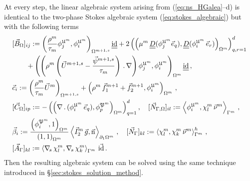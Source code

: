 At every step, the linear algebraic system arising from (\ref{eq:ns_HGalea}--d)
is identical to the two-phase Stokes algebraic system
(\ref{eq:stokes_algebraic}) but with the following terms
\begin{align*}
& [\vec B_\Omega]_{ij} := \left( \frac{\rho^m}{\tau_m}
\phi_j^{\uspacesimpleale^m},
\phi_i^{\uspacesimpleale^m} \right)_{\Omega^{m+1,s}}\mat \id
+ 2\left(\left(\mu^m\,\mat D(\phi_j^{\uspacesimpleale^m} \vec e_q),
\mat D(\phi_i^{\uspacesimpleale^m}\,\vec e_r)\right)_{\Omega^m}
\right)_{q,r=1}^d\\
& \qquad + \left( \left(\rho^m \left(\vec U^{m+1,s} -
\frac{\vec \psi^{m+1,s}}{\tau_m}\right)\,.\,\nabla \right)
\phi_j^{\uspacesimpleale^m},\phi_i^{\uspacesimpleale^m}
\right)_{\Omega^m}\mat \id \,,\\
& \vec c_i := \left( \frac{\rho^m}{\tau_m}\vec U^m \right)_{\Omega^{m+1,s}}
+ \left(\rho^m\,\vec f_1^{m+1}+\vec f_2^{m+1},
\phi_i^{\uspacesimpleale^m}\right)_{\Omega^m}\,,\\
& [\vec C_\Omega]_{ip} := - \left(
\left(\nabla\,.\,(\phi_i^{\uspacesimpleale^m}\,\vec
e_q), \phi_p^{\pspaceale^m} \right)_{\Omega^m} \right)_{q=1}^d,\quad
[\Nbulk]_{il} := \left\langle \phi_i^{\uspacesimpleale^m}, \chi^m_l \,\vec\nu^m
\right\rangle_{\Gamma^m} \,,\\
& \vec \beta_i :=
\frac{\left(\phi_i^{\pspaceale^m},1\right)_{\Omega^m}}{\left(1,1\right)
_{\Omega^m}} \left\langle \vec I_2^m\,\vec
g,\unitn\right\rangle_{\partial_1\Omega^m}\,,\quad
[\vec N_\Gamma]_{kl} := \left\langle \chi^m_l, \chi^m_k\,\vec\nu^m
\right\rangle_{\Gamma^m}^h \,,\\
& [\vec A_\Gamma]_{kl} := \left\langle \nabs\,\chi^m_l, \nabs\,\chi^m_k
\right\rangle_{\Gamma^m} \,\vec\id \,.
\end{align*}
Then the resulting algebraic system can be solved using the same technique
introduced in \S\ref{sec:stokes_solution_method}.